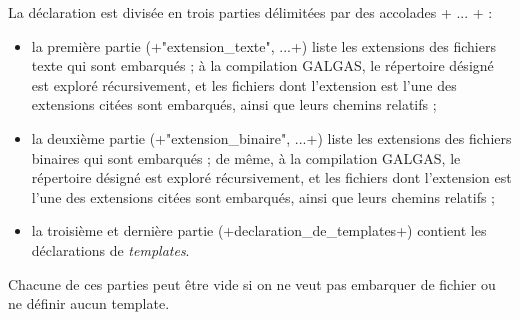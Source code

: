 La déclaration est divisée en trois parties délimitées par des accolades \ggs+{ ... }+ :
\begin{itemize}
  \item la première partie (\ggs+"extension_texte", ...+) liste les extensions des fichiers texte qui sont embarqués ; à la compilation GALGAS, le répertoire désigné est exploré récursivement, et les fichiers dont l'extension est l'une des extensions citées sont embarqués, ainsi que leurs chemins relatifs ;
  \item la deuxième partie (\ggs+"extension_binaire", ...+) liste les extensions des fichiers binaires qui sont embarqués ; de même, à la compilation GALGAS, le répertoire désigné est exploré récursivement, et les fichiers dont l'extension est l'une des extensions citées sont embarqués, ainsi que leurs chemins relatifs ;
  \item la troisième et dernière partie (\ggs+declaration_de_templates+) contient les déclarations de \emph{templates}.
\end{itemize}

Chacune de ces parties peut être vide si on ne veut pas embarquer de fichier ou ne définir aucun template.


